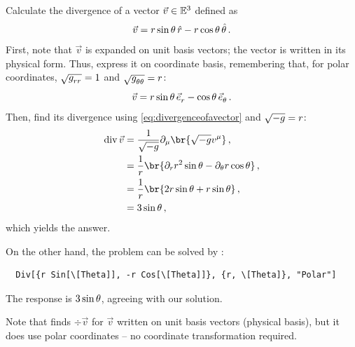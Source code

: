  Calculate the divergence of a vector $\vec v\in\mathbb{E}^{3}$ defined as
%
\begin{equation*}
  \vec v = r\sin\theta\,\hat{r} - r\cos\theta\,\hat{\theta}\,.
\end{equation*}
%
 First, note that $\vec v$ is expanded on unit basis vectors; the vector is written in its physical form. Thus, express it on coordinate basis, remembering that, for polar coordinates, $\sqrt{\tmetric\cxpos\cxpos} = 1$ and $\sqrt{\tmetric\cypos\cypos} = \cxpos$:
%
\begin{equation*}
  \vec v = \cxpos\sin\cypos\,\tbvec\cxpos - \cos\cypos\,\tbvec\cypos\,.
\end{equation*}
%
Then, find its divergence using \cref{eq:divergenceofavector} and $\sqrt{-g} = r$:
%
\begin{align*}
  \div\vec v &= \dfrac{1}{\sqrt{-\metric}}\ipd\mu\br{\sqrt{-\metric}\tvec v\mu}\,, \\
             &= \dfrac{1}{\cxpos}\br{\ipd\cxpos\cxpos^2\sin\cypos - \ipd\cypos\cxpos\cos\cypos}\,, \\
             &= \dfrac{1}{\cxpos}\br{2\cxpos\sin\cypos + \cxpos\sin\cypos} \,,\\
             &= 3\sin\cypos\,,
\end{align*}
%
which yields the answer.

On the other hand, the problem can be solved by :
%
\begin{lstlisting}
  Div[{r Sin[\[Theta]], -r Cos[\[Theta]]}, {r, \[Theta]}, "Polar"]
\end{lstlisting}
%
The response is $3\sin\theta$, agreeing with our solution.

 Note that  finds $\div\vec v$ for $\vec v$ written on unit basis vectors (physical basis), but it does use polar coordinates -- no coordinate transformation required.

